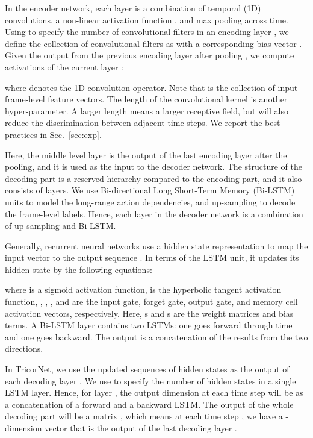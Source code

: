 \documentclass{article}
\begin{document}
In the encoder network, each layer  is a combination of temporal (1D) convolutions, a non-linear activation function , and max pooling across time. Using  to specify the number of convolutional filters in an encoding layer , we define the collection of convolutional filters as  with a corresponding bias vector  . Given the output from the previous encoding layer after pooling , we compute activations of the current layer : 

where  denotes the 1D convolution operator. Note that  is the collection of input frame-level feature vectors. The length of the convolutional kernel is another hyper-parameter. A larger length means a larger receptive field, but will also reduce the discrimination between adjacent time steps. We report the best practices in Sec.~\ref{sec:exp}.

Here, the middle level layer  is the output of the last encoding layer  after the pooling, and it is used as the input to the decoder network. The structure of the decoding part is a reserved hierarchy compared to the encoding part, and it also consists of  layers. We use Bi-directional Long Short-Term Memory (Bi-LSTM)~\cite{graves2005bidirectional} units to model the long-range action dependencies, and up-sampling to decode the frame-level labels. Hence, each layer  in the decoder network is a combination of up-sampling and Bi-LSTM. 

Generally, recurrent neural networks use a hidden state representation  to map the input vector  to the output sequence . In terms of the LSTM unit, it updates its hidden state by the following equations: 

where  is a sigmoid activation function,  is the hyperbolic tangent activation function, , , , and  are the input gate, forget gate, output gate, and memory cell activation vectors, respectively. Here, s and s are the weight matrices and bias terms. A Bi-LSTM layer contains two LSTMs: one goes forward through time and one goes backward. The output is a concatenation of the results from the two directions. 

In TricorNet, we use the updated sequences of hidden states  as the output of each decoding layer .  We use  to specify the number of hidden states in a single LSTM layer. Hence, for layer , the output dimension at each time step will be  as a concatenation of a forward and a backward LSTM. The output of the whole decoding part will be a matrix , which means at each time step , we have a -dimension vector  that is the output of the last decoding layer .
\end{document}

